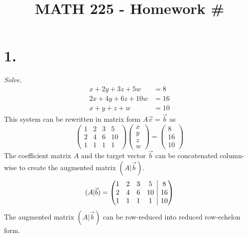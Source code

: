 \documentclass[12pt]{article}
\title{\vspace{-2\baselineskip}MATH 225 - Homework \#\HOMEWORKNUM}
\author{\NAME}
\date{\DATE}
\makeatletter
\newenvironment{amatrix}[1]{%
  \left(\begin{array}{@{}*{#1}{c}|c@{}}
}{%
  \end{array}\right)
}
\makeatother
\begin{document}
\maketitle

\section*{1.}
\textit{Solve.}
\begin{align*}
	x + 2y + 3z + 5w &= 8 \\
	2x + 4y + 6z + 10w &= 16 \\
	x + y + z + w &= 10
\end{align*}
This system can be rewritten in matrix form $A\vec{v} = \vec{b}$ as
\begin{equation*}
	\begin{pmatrix}
		1 & 2 & 3 & 5 \\
		2 & 4 & 6 & 10 \\
		1 & 1 & 1 & 1
	\end{pmatrix}
	\begin{pmatrix} x \\ y \\ z \\ w \end{pmatrix}
	=
	\begin{pmatrix} 8 \\ 16 \\ 10 \end{pmatrix}
\end{equation*}
The coefficient matrix $A$ and the target vector $\vec{b}$ can be concatenated
column-wise to create the augmented matrix $(A|\vec{b})$.
\begin{equation*}
	(A|\vec{b}) =
	\begin{amatrix}{4}
		1 & 2 & 3 & 5 & 8 \\
		2 & 4 & 6 & 10 & 16 \\
		1 & 1 & 1 & 1 & 10
	\end{amatrix}
\end{equation*}
The augmented matrix $(A|\vec{b})$ can be row-reduced into reduced row-echelon
form.
\footnotesize
\end{document}
